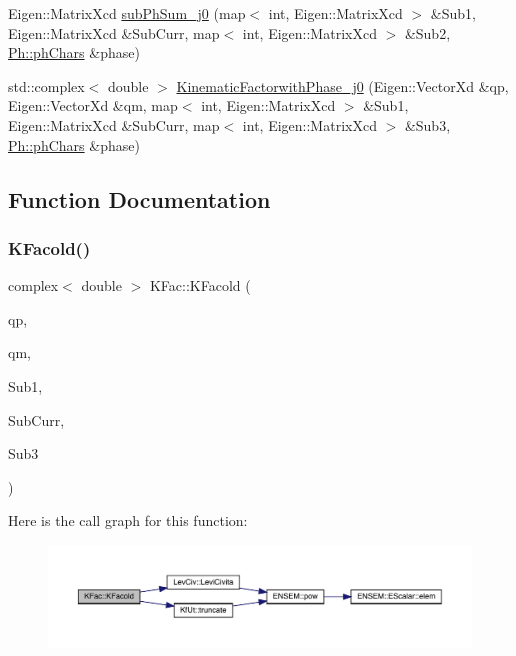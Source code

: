 \begin{DoxyCompactItemize}
\item 
Eigen\+::\+Matrix\+Xcd \mbox{\hyperlink{namespaceKFac_abb86856b8424632f8f879408ce2cc05b}{sub\+Ph\+Sum\+\_\+j0}} (map$<$ int, Eigen\+::\+Matrix\+Xcd $>$ \&Sub1, Eigen\+::\+Matrix\+Xcd \&Sub\+Curr, map$<$ int, Eigen\+::\+Matrix\+Xcd $>$ \&Sub2, \mbox{\hyperlink{structPh_1_1phChars}{Ph\+::ph\+Chars}} \&phase)
\item 
std\+::complex$<$ double $>$ \mbox{\hyperlink{namespaceKFac_a8a20f176fbf91758f8699734b8df3f04}{Kinematic\+Factorwith\+Phase\+\_\+j0}} (Eigen\+::\+Vector\+Xd \&qp, Eigen\+::\+Vector\+Xd \&qm, map$<$ int, Eigen\+::\+Matrix\+Xcd $>$ \&Sub1, Eigen\+::\+Matrix\+Xcd \&Sub\+Curr, map$<$ int, Eigen\+::\+Matrix\+Xcd $>$ \&Sub3, \mbox{\hyperlink{structPh_1_1phChars}{Ph\+::ph\+Chars}} \&phase)
\end{DoxyCompactItemize}


\subsection{Function Documentation}
\mbox{\label{namespaceKFac_a3226cfdfe24c39b0713ca6ede04de295}} 
\subsubsection{\texorpdfstring{KFacold()}{KFacold()}}
{\footnotesize\ttfamily complex$<$ double $>$ K\+Fac\+::\+K\+Facold (\begin{DoxyParamCaption}\item[{Eigen\+::\+Vector\+Xd \&}]{qp,  }\item[{Eigen\+::\+Vector\+Xd \&}]{qm,  }\item[{Eigen\+::\+Matrix\+Xcd \&}]{Sub1,  }\item[{Eigen\+::\+Matrix\+Xcd \&}]{Sub\+Curr,  }\item[{Eigen\+::\+Matrix\+Xcd \&}]{Sub3 }\end{DoxyParamCaption})}

Here is the call graph for this function\+:\nopagebreak
\begin{figure}[H]
\begin{center}
\leavevmode
\includegraphics[width=350pt]{d2/d89/namespaceKFac_a3226cfdfe24c39b0713ca6ede04de295_cgraph}
\end{center}
\end{figure}
\mbox{\label{namespaceKFac_a4cb65a4089c62e25d5511e2711fed59d}} 
